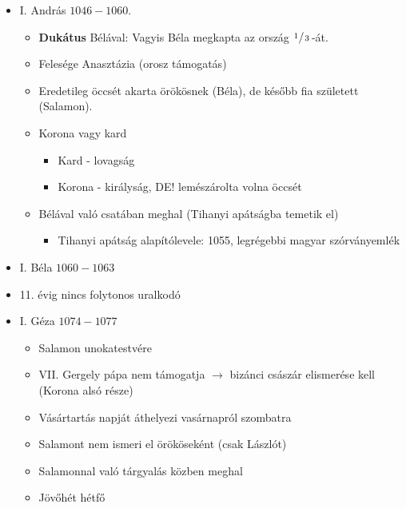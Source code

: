 \documentclass{article}
\begin{document}
\begin{itemize}
\begin{itemize}
        \item \textbf{Mártírhalál/Vértanú}: Meghal valamilyen fontos ügyért. A mártír feláldozza magát, a vértanú nem feltétlenül, csak fontos ügyért hal meg. Keresztény kifejezések. 
        
    \end{itemize}
    \item I. András $1046-1060$.
    \begin{itemize}
        \item \textbf{Dukátus} Bélával: Vagyis Béla megkapta az ország $\nicefrac{1\,}{\,3}\,$-át.
        \item Felesége Anasztázia (orosz támogatás)
        \item Eredetileg öccsét akarta örökösnek (Béla), de később fia született (Salamon).
        \item Korona vagy kard 
        \begin{itemize}
            \item Kard - lovagság
            \item Korona - királyság, DE! lemészárolta volna öccsét
        \end{itemize}
        \item Bélával való csatában meghal (Tihanyi apátságba temetik el) 
        \begin{itemize}
            \item Tihanyi apátság alapítólevele: 1055, legrégebbi magyar szórványemlék
        \end{itemize}
    \end{itemize}
    
    \item I. Béla $1060-1063$

    \item 11. évig nincs folytonos uralkodó
    
    \item I. Géza $1074-1077$
    \begin{itemize}
        \item Salamon unokatestvére
        \item VII. Gergely pápa nem támogatja $\rightarrow$ bizánci császár elismerése kell (Korona alsó része) 
        \item Vásártartás napját áthelyezi vasárnapról szombatra 
        \item Salamont nem ismeri el örököseként (csak Lászlót)
        \item Salamonnal való tárgyalás közben meghal
        \item Jövőhét hétfő
    \end{itemize}
\end{itemize}
\end{document}

